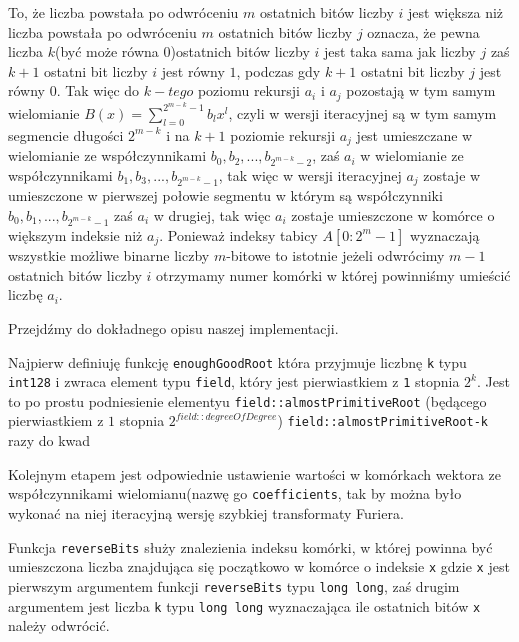 \documentclass{article}
\begin{document}
To, że liczba powstała po odwróceniu $m$ ostatnich bitów liczby $i$ jest większa niż liczba powstała po odwróceniu $m$ ostatnich bitów liczby $j$ oznacza, że pewna liczba $k$(być może równa 
$0$)ostatnich bitów liczby $i$ jest taka sama jak liczby $j$ 
zaś $k+1$ ostatni bit liczby $i$ jest równy $1$, podczas gdy $k+1$ ostatni bit liczby $j$
jest równy $0$.
Tak więc do $k-tego$ poziomu rekursji $a_i$ i $a_j$ pozostają w tym samym wielomianie $B(x)=
\sum^{2^{m-k}-1}_{l=0} b_lx^l$, czyli w wersji iteracyjnej są w tym samym segmencie 
długości $2^{m-k}$ i na $k+1$ poziomie rekursji $a_j$ jest umieszczane w wielomianie
ze współczynnikami $b_0,b_2,...,b_{2^{m-k}-2}$, zaś $a_i$ w wielomianie ze współczynnikami
$b_1,b_3,...,b_{2^{m-k}-1}$, tak więc w wersji iteracyjnej $a_j$ zostaje w umieszczone w pierwszej połowie 
segmentu w którym są współczynniki $b_0, b_1,...,b_{2^{m-k}-1}$ zaś $a_i$ w drugiej, tak więc $a_i$ zostaje umieszczone w komórce o większym indeksie niż $a_j$. Ponieważ indeksy tabicy $A[0:2^m-1]$ 
wyznaczają wszystkie możliwe binarne liczby $m$-bitowe to istotnie jeżeli odwrócimy $m-1$ ostatnich bitów liczby $i$ otrzymamy numer komórki
w której powinniśmy umieścić liczbę $a_i$.


Przejdźmy do dokładnego opisu naszej implementacji. 

Najpierw definiuję funkcję \texttt{enoughGoodRoot} która przyjmuje liczbnę \texttt{k} typu 
\texttt{\textunderscore \textunderscore int128}
 i zwraca element typu \texttt{field}, który jest pierwiastkiem z \texttt{1} stopnia $2^k$. 
Jest to po prostu podniesienie elementyu \texttt{field::almostPrimitiveRoot} (będącego pierwiastkiem z $1$ stopnia $2^{field::degreeOfDegree}$) \texttt{field::almostPrimitiveRoot-k}
razy do kwad





Kolejnym etapem jest odpowiednie ustawienie wartości w komórkach wektora ze współczynnikami wielomianu(nazwę go \texttt{coefficients}, tak by można było wykonać na niej iteracyjną wersję szybkiej transformaty Furiera. 



Funkcja \texttt{reverseBits} służy znalezienia indeksu komórki, w której powinna być umieszczona 
liczba znajdująca się początkowo w komórce o indeksie \texttt{x} gdzie \texttt{x} jest pierwszym 
argumentem funkcji \texttt{reverseBits} typu
\texttt{long long}, zaś drugim argumentem jest liczba \texttt{k} 
typu \texttt{long long} wyznaczająca ile ostatnich bitów \texttt{x} należy odwrócić.
\end{document}
